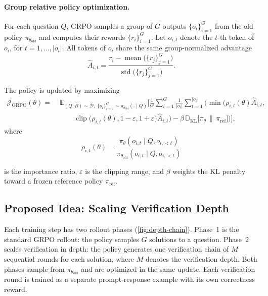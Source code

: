 \documentclass[11pt]{article}
\theoremstyle{definition}
\theoremstyle{plain}
\begin{document}
\paragraph{Group relative policy optimization.}
For each question $Q$, GRPO samples a group of $G$ outputs $\{o_i\}_{i=1}^{G}$ from the old policy $\pi_{\theta_{\mathrm{old}}}$ and computes their rewards $\{r_i\}_{i=1}^{G}$. Let $o_{i,t}$ denote the $t$-th token of $o_i$, for $t=1,\ldots,|o_i|$. All tokens of $o_i$ share the same group-normalized advantage
\begin{equation}
\hat A_{i,t}=
\frac{r_i-\operatorname{mean}\big(\{r_j\}_{j=1}^{G}\big)}
{\operatorname{std}\big(\{r_j\}_{j=1}^{G}\big)}.
\end{equation}

The policy is updated by maximizing
\begin{equation}
\label{eq:grpo}
\begin{aligned}
\mathcal J_{\mathrm{GRPO}}(\theta)
=\;&\mathbb E_{(Q,R)\sim\mathcal D,\;
\{o_i\}_{i=1}^{G}\sim\pi_{\theta_{\mathrm{old}}}(\cdot\mid Q)}
\Bigg[\frac{1}{G}\sum_{i=1}^{G}\frac{1}{|o_i|}\sum_{t=1}^{|o_i|}
\Big(\min\big(\rho_{i,t}(\theta)\hat A_{i,t},\\
&\qquad\operatorname{clip}\big(\rho_{i,t}(\theta),1-\varepsilon,1+\varepsilon\big)\hat A_{i,t}\big)
-\beta\,\mathbb D_{\mathrm{KL}}\big[\pi_\theta\,\|\,\pi_{\mathrm{ref}}\big]\Big)\Bigg],
\end{aligned}
\end{equation}
where
\begin{equation}
\rho_{i,t}(\theta)=
\frac{\pi_\theta(o_{i,t}\mid Q,o_{i,<t})}
{\pi_{\theta_{\mathrm{old}}}(o_{i,t}\mid Q,o_{i,<t})}
\end{equation}

is the importance ratio, $\varepsilon$ is the clipping range, and $\beta$ weights the KL penalty toward a frozen reference policy $\pi_{\mathrm{ref}}$.

\subsection{Proposed Idea: Scaling Verification Depth}

Each training step has two rollout phases (\cref{fig:depth-chain}).
Phase~1 is the standard GRPO rollout: the policy samples $G$ solutions
to a question. Phase~2 scales verification in depth: the policy
generates one verification chain of $M$ sequential rounds for each
solution, where $M$ denotes the verification depth.
Both phases sample from $\pi_{\theta_{\mathrm{old}}}$ and are
optimized in the same update. Each verification round is trained as
a separate prompt-response example with its own correctness reward.
\end{document}
